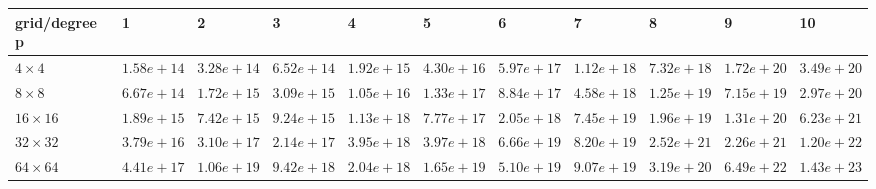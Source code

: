 \begin{tabular}{lllllllllll}
\hline
 grid/degree p   & 1          & 2          & 3          & 4          & 5          & 6          & 7          & 8          & 9          & 10         \\
\hline
 $4 \times 4$    & $1.58e+14$ & $3.28e+14$ & $6.52e+14$ & $1.92e+15$ & $4.30e+16$ & $5.97e+17$ & $1.12e+18$ & $7.32e+18$ & $1.72e+20$ & $3.49e+20$ \\
 $8 \times 8$    & $6.67e+14$ & $1.72e+15$ & $3.09e+15$ & $1.05e+16$ & $1.33e+17$ & $8.84e+17$ & $4.58e+18$ & $1.25e+19$ & $7.15e+19$ & $2.97e+20$ \\
 $16 \times 16$  & $1.89e+15$ & $7.42e+15$ & $9.24e+15$ & $1.13e+18$ & $7.77e+17$ & $2.05e+18$ & $7.45e+19$ & $1.96e+19$ & $1.31e+20$ & $6.23e+21$ \\
 $32 \times 32$  & $3.79e+16$ & $3.10e+17$ & $2.14e+17$ & $3.95e+18$ & $3.97e+18$ & $6.66e+19$ & $8.20e+19$ & $2.52e+21$ & $2.26e+21$ & $1.20e+22$ \\
 $64 \times 64$  & $4.41e+17$ & $1.06e+19$ & $9.42e+18$ & $2.04e+18$ & $1.65e+19$ & $5.10e+19$ & $9.07e+19$ & $3.19e+20$ & $6.49e+22$ & $1.43e+23$ \\
\hline
\end{tabular}